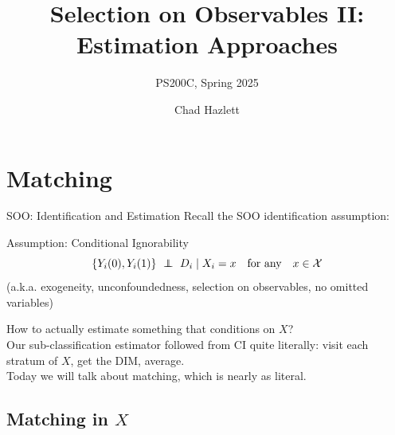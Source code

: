 \documentclass[xcolor=dvipsnames]{beamer}
\title[]{Selection on Observables II: Estimation Approaches}
\subtitle[ ]{PS200C, Spring 2025}
\author[Hazlett]{Chad Hazlett }
\institute[UCLA]{UCLA\\[1ex]
  \texttt{chazlett@ucla.edu}
}
\date{}
\newcommand\indep{\protect\mathpalette{\protect\independenT}{\perp}}
\def\independenT#1#2{\mathrel{\rlap{$#1#2$}\mkern2mu{#1#2}}}
\begin{document}
\subject{Talks}



\begin{frame}
  \titlepage
\end{frame}


\section{Matching}\label{matching}

\begin{frame}{SOO: Identification and Estimation}
 Recall the SOO identification assumption:

\begin{block}{Assumption: Conditional Ignorability}
$$ \{ Y_i(0), Y_i(1)\} \ \indep \ D_i \mid X_i = x \quad \text{for any} \quad x \in \mathcal{X} $$
\smallskip
\footnotesize
(a.k.a. exogeneity, unconfoundedness, selection on observables, no omitted variables) \\
\end{block}
\bigskip
\small
{} How to actually estimate something that conditions on $X$? \\
\bigskip
{} Our sub-classification estimator followed from CI quite literally:  visit each stratum of $X$, get the DIM, average.\\
\bigskip
{} Today we will talk about \alert{matching}, which is nearly as literal.
\end{frame}

\begin{frame}{}

\centering


\end{frame}

\subsection{Matching in $X$}
\end{document}
